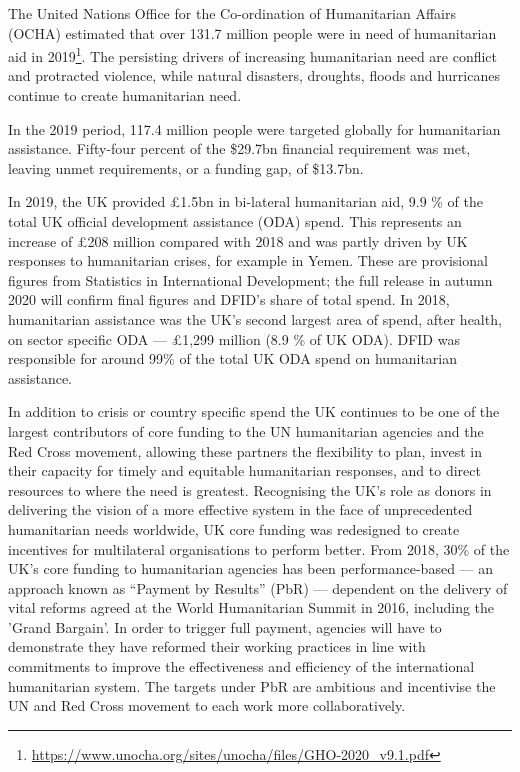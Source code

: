 The United Nations Office for the Co-ordination of Humanitarian Affairs (OCHA) estimated that over 131.7 million people were in need of humanitarian aid in 2019\footnote{\href{https://www.unocha.org/sites/unocha/files/GHO-2020_v9.1.pdf}{https://www.unocha.org/sites/unocha/files/GHO-2020\_v9.1.pdf}}. %
The persisting drivers of increasing humanitarian need are conflict and protracted violence, while natural disasters, droughts, floods and hurricanes continue to create humanitarian need. %

In the 2019 period, 117.4 million people were targeted globally for humanitarian assistance. %
Fifty-four percent of the \$29.7bn financial requirement was met, leaving unmet requirements, or a funding gap, of \$13.7bn. %

In 2019, the UK provided \pounds 1.5bn in bi-lateral humanitarian aid, 9.9 \% of the total UK official development assistance (ODA) spend. %
This represents an increase of \pounds 208 million compared with 2018 and was partly driven by UK responses to humanitarian crises, for example in Yemen. %
These are provisional figures from Statistics in International Development; the full release in autumn 2020 will confirm final figures and DFID's share of total spend. %
In 2018, humanitarian assistance was the UK's second largest area of spend, after health, on sector specific ODA --- \pounds 1,299 million (8.9 \% of UK ODA). %
DFID was responsible for around 99\% of the total UK ODA spend on humanitarian assistance. %

In addition to crisis or country specific spend the UK continues to be one of the largest contributors of core funding to the UN humanitarian agencies and the Red Cross movement, allowing these partners the flexibility to plan, invest in their capacity for timely and equitable humanitarian responses, and to direct resources to where the need is greatest. %
Recognising the UK's role as donors in delivering the vision of a more effective system in the face of unprecedented humanitarian needs worldwide, UK core funding was redesigned to create incentives for multilateral organisations to perform better. %
From 2018, 30\% of the UK's core funding to humanitarian agencies has been performance-based --- an approach known as ``Payment by Results'' (PbR) --- dependent on the delivery of vital reforms agreed at the World Humanitarian Summit in 2016, including the 'Grand Bargain'. %
In order to trigger full payment, agencies will have to demonstrate they have reformed their working practices in line with commitments to improve the effectiveness and efficiency of the international humanitarian system. %
The targets under PbR are ambitious and incentivise the UN and Red Cross movement to each work more collaboratively. %

